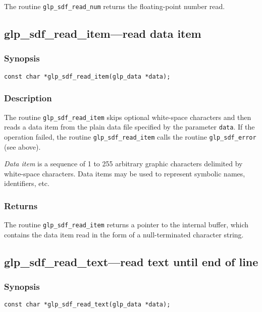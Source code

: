 The routine \verb|glp_sdf_read_num| returns the floating-point number
read.

\subsection{glp\_sdf\_read\_item---read data item}

\subsubsection*{Synopsis}

\begin{verbatim}
const char *glp_sdf_read_item(glp_data *data);
\end{verbatim}

\subsubsection*{Description}

The routine \verb|glp_sdf_read_item| skips optional white-space
characters and then reads a data item from the plain data file specified
by the parameter \verb|data|. If the operation failed, the routine
\verb|glp_sdf_read_item| calls the routine \verb|glp_sdf_error| (see
above).

{\it Data item} is a sequence of 1 to 255 arbitrary graphic characters
delimited by white-space characters. Data items may be used to represent
symbolic names, identifiers, etc.

\subsubsection*{Returns}

The routine \verb|glp_sdf_read_item| returns a pointer to the internal
buffer, which contains the data item read in the form of a
null-terminated character string.

\newpage

\subsection{glp\_sdf\_read\_text---read text until end of line}

\subsubsection*{Synopsis}

\begin{verbatim}
const char *glp_sdf_read_text(glp_data *data);
\end{verbatim}

